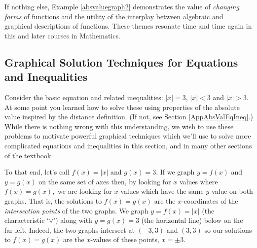 If nothing else, Example \ref{absvaluegraph2} demonstrates the value of \textit{changing forms} of functions and the utility of the interplay between algebraic and graphical descriptions of functions.  These themes resonate time and time again in this and later courses in Mathematics.  

\subsection{Graphical Solution Techniques for Equations and Inequalities}
\label{EquationsInequalitiesGraphically}

Consider the basic equation and related inequalities: $|x| = 3$, $|x| < 3$ and $|x| > 3$.  At some point you learned  how to solve these using properties of the absolute value inspired by the distance definition. (If not, see Section \ref{AppAbsValEqIneq}.)   While there is nothing wrong with this understanding, we wish to use these problems to motivate powerful graphical techniques which we'll use to solve more complicated equations and inequalities in this section, and in many other sections of the textbook.    

\medskip

To that end, let's call $f(x)  = |x|$ and $g(x) = 3$. If we graph $y = f(x)$ and $y = g(x)$ on the same set of axes then, by looking for $x$ values where $f(x) = g(x),$ we are looking for $x$-values which have the same $y$-value on both graphs. That is, the solutions to $f(x) = g(x)$ are the $x$-coordinates of the \textit{intersection points} of the two graphs.  We graph $y = f(x) = |x|$ (the characteristic `$\vee$') along with $y = g(x) = 3$ (the horizontal line) below on the far left.  Indeed, the two graphs intersect at $(-3, 3)$ and $(3, 3)$ so our solutions to $f(x) = g(x)$ are the $x$-values of these points, $x = \pm 3$.    

